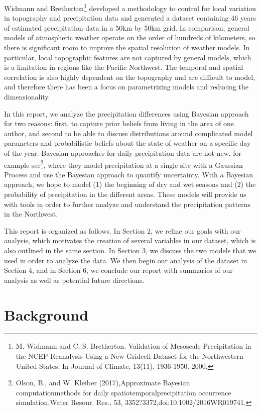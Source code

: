 \documentclass{article}
\begin{document}
Widmann and Bretherton\footnote{M. Widmann and C. S. Bretherton. Validation of Mesoscale Precipitation in the NCEP Reanalysis Using a New Gridcell Dataset for the Northwestern United States. In Journal of Climate, 13(11), 1936-1950. 2000.} developed a methodology to control for local variation in topography and precipitation data and generated a dataset containing 46 years of estimated precipitation data in a 50km by 50km grid.  In comparison, general models of atmospheric weather operate on the order of hundreds of kilometers, so there is significant room to improve the spatial resolution of weather models.  In particular, local topographic features are not captured by general models, which is a limitation in regions like the Pacific Northwest. The temporal and spatial correlation is also highly dependent on the topography and are difficult to model, and therefore there has been a focus on parametrizing models and reducing the dimensionality. 

In this report, we analyze the precipitation differences using Bayesian approach for two reasons: first, to capture prior beliefs  from living in the area of one author, and second to be able to discuss distributions around complicated model parameters and probabilistic beliefs about the state of weather on a specific day of the year. Bayesian approaches for daily precipitation data are not new, for example see\footnote{Olson, B., and W. Kleiber (2017),Approximate Bayesian computationmethods for daily spatiotemporalprecipitation occurrence simulation,Water Resour. Res., 53, 3352?3372,doi:10.1002/2016WR019741.}, where they model precipitation at a single site with a Gaussian Process and use the Bayesian approach to quantify uncertainty. With a Bayesian approach, we hope to model (1) the beginning of dry and wet seasons and (2) the probability of precipitation in the different areas. These models will provide us with tools in order to further analyze and understand the precipitation patterns in the Northwest. 

This report is organized as follows. In Section 2, we refine our goals with our analysis, which motivates the creation of several variables in our dataset, which is also outlined in the same section. In Section 3, we discuss the two models that we used in order to analyze the data.  We then begin our analysis of the dataset in Section 4, and in Section 6, we conclude our report with summaries of our analysis as well as potential future directions.

\section{Background}
\end{document}
